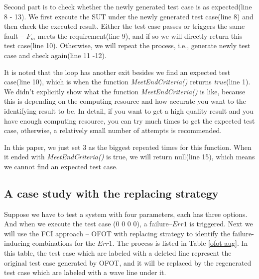\documentclass{sig-alternate}
\begin{document}
Second part is to check whether the newly generated test case is as expected(line 8 - 13). We first execute the SUT under the newly generated test case(line 8) and then check the executed result. Either the test case passes or triggers the same fault -- $F_{m}$ meets the requirement(line 9), and if so we will directly return this test case(line 10). Otherwise, we will repeat the process, i.e., generate newly test case and check again(line 11 -12).

It is noted that the loop has another exit besides we find an expected test case(line 10), which is when the function \emph{MeetEndCriteria()} returns \emph{true}(line 1). We didn't explicitly show what the function \emph{MeetEndCriteria()} is like, because this is depending on the computing resource and how accurate you want to the identifying result to be. In detail, if you want to get a high quality result and you have enough computing resource, you can try much times to get the expected test case, otherwise, a relatively small number of attempts is recommended.

In this paper, we just set 3 as the biggest repeated times for this function. When it ended with \emph{MeetEndCriteria()} is true, we will return null(line 15), which means we cannot find an expected test case.

\subsection{A case study with the replacing strategy}

Suppose we have to test a system with four parameters, each has three options. And when we execute the test case (0 0 0 0), a failure--$Err 1$ is triggered. Next we will use the FCI approach -- OFOT with replacing strategy to identify the failure-inducing combinations for the $Err 1$. The process is listed in Table \ref{ofot-aug}. In this table, the test case which are labeled with a deleted line represent the original test case generated by OFOT, and it will be replaced by the regenerated test case which are labeled with a wave line under it.
\end{document}
